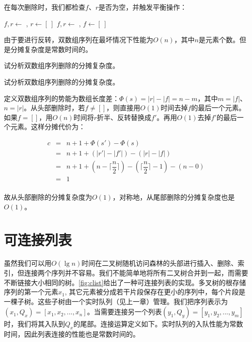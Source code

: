 \documentclass[b5paper]{ctexart}
\begin{document}
在每次删除时，我们都检查$f$、$r$是否为空，并触发平衡操作：

\begin{algorithmic}[1]
  \State {}
  \State $f, r \gets$ , 
   
    \State $r \gets [\ ]$
  \Else
    \State {}
  \EndIf
\EndFunction
\Statex
{}
  \State {}
  \State $f, r \gets$ , 
   
    \State $f \gets [\ ]$
  \Else
    \State {}
  \EndIf
\EndFunction
\end{algorithmic}

由于要进行反转，双数组序列在最坏情况下性能为$O(n)$，其中$n$是元素个数。但是分摊复杂度是常数时间的。

\begin{Exercise}\label{ex:paired-array-seq}
试分析双数组序列删除的分摊复杂度。
\end{Exercise}

\begin{Answer}[ref = {ex:paired-array-seq}]
试分析双数组序列删除的分摊复杂度。

定义双数组序列的势能为数组长度差：$\Phi(s) = |r| - |f| = n - m$，其中$m = |f|$、$n = |r|$。从头部删除时，若$f \neq []$，则直接用$O(1)$时间去掉$f$的最后一个元素。如果$f = []$，用$O(n)$时间将$r$折半、反转替换成$f'$。再用$O(1)$去掉$f'$的最后一个元素。这样分摊代价为：

\[
\begin{array}{rcl}
c & = & n + 1 + \Phi(s') - \Phi(s) \\
  & = & n + 1 + (|r'| - |f'|) - (|r| - |f|) \\
  & = & n + 1 + (n - \lceil \dfrac{n}{2} \rceil) - (\lceil \dfrac{n}{2} \rceil - 1) -  (n - 0) \\
  & = & 1 \\
\end{array}
\]

故从头部删除的分摊复杂度为$O(1)$，对称地，从尾部删除的分摊复杂度也是$O(1)$。
\end{Answer}

\section{可连接列表}

虽然我们可以用$O(\lg n)$时间在二叉树随机访问森林的头部进行插入、删除、索引，但连接两个序列并不容易。我们不能简单地将所有二叉树合并到一起，而需要不断链接大小相同的树。\cref{fig:clist}给出了一种可连接列表的实现。多叉树的根存储序列的第一个元素$x_1$, 其它元素被分成若干片段保存在更小的序列中，每个片段是一棵子树。这些子树由一个实时队列（见上一章）管理。我们把序列表示为$(x_1, Q_x) = [x_1, x_2, ..., x_n]$。当需要连接另一个列表$(y_1, Q_y) = [y_1, y_2, ..., y_m]$时，我们将其入队到$Q_x$的尾部。连接运算定义如下。实时队列的入队性能为常数时间，因此列表连接的性能也是常数时间的。
\end{document}
